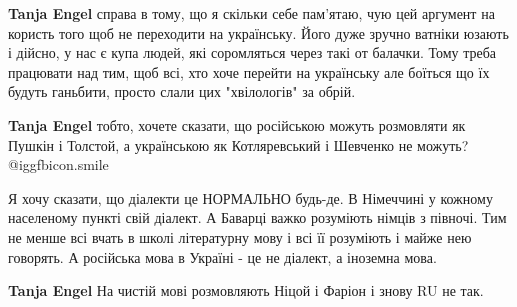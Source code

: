 \begin{itemize} %
 
\textbf{Tanja Engel} справа в тому, що я скільки себе пам'ятаю, чую цей аргумент на користь того щоб не переходити на українську. Його дуже зручно ватніки юзають і дійсно, у нас є купа людей, які соромляться через такі от балачки. Тому треба працювати над тим, щоб всі, хто хоче перейти на українську але боїться що їх будуть ганьбити, просто слали цих "хвілологів" за обрій.

 

\textbf{Tanja Engel} тобто, хочете сказати, що російською можуть розмовляти як Пушкін і Толстой, а українською як Котляревський і Шевченко не можуть?  @igg{fbicon.smile} 

 

Я хочу сказати, що діалекти це НОРМАЛЬНО будь-де. В Німеччині у кожному
населеному пункті свій діалект. А Баварці важко розуміють німців з півночі. Тим
не менше всі вчать в школі літературну мову і всі її розуміють і майже нею
говорять. А російська мова в Україні - це не діалект, а іноземна мова.


 
\textbf{Tanja Engel}
На чистій мові розмовляють Ніцой і Фаріон і знову RU не так.

\end{itemize} %

 

